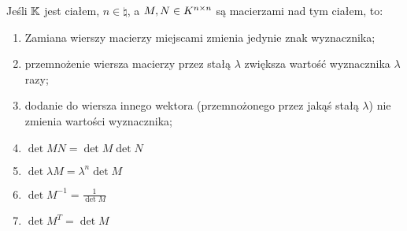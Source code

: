 \begin{fact}
    Jeśli \(\mathbb{K}\) jest ciałem, \(n \in \natural\), a \(M, N \in K^{n \times n}\) są macierzami nad tym ciałem, to:
    
    \begin{enumerate}
        \item Zamiana wierszy macierzy miejscami zmienia jedynie znak wyznacznika;
        \item przemnożenie wiersza macierzy przez stałą \(\lambda\) zwiększa wartość wyznacznika \(\lambda\) razy;
        \item dodanie do wiersza innego wektora (przemnożonego przez jakąś stałą \(\lambda\)) nie zmienia wartości wyznacznika;
        \item \( \det{MN} = \det{M} \det{N} \)
        \item \( \det{\lambda M} = \lambda^n \det{M}\)
        \item \( \det{M^{-1}} = \frac{1}{\det{M}}\)
        \item \( \det{M^T} = \det{M}\)
    \end{enumerate}
    
\end{fact}